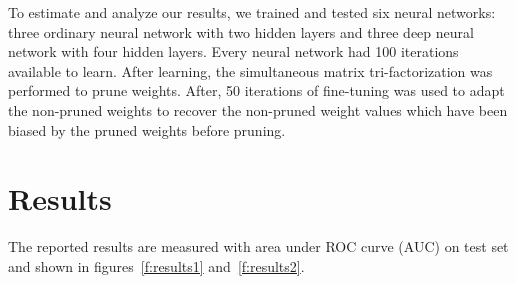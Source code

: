 \documentclass{article} %
\begin{document}
To estimate and analyze our results, we trained and tested six neural networks: 
three 
ordinary neural network with two hidden layers and three deep neural network 
with four 
hidden layers. Every neural network had 100 iterations available to learn. After 
learning, the simultaneous matrix tri-factorization was performed to prune 
weights. After, 50 iterations of fine-tuning was used to adapt the non-pruned 
weights to recover the non-pruned weight values which have been biased by the 
pruned weights before 
pruning. 

\section{Results}
The reported results are measured with area under ROC curve (AUC) on test set 
and shown in figures~\ref{f:results1} and~\ref{f:results2}. 
\end{document}
